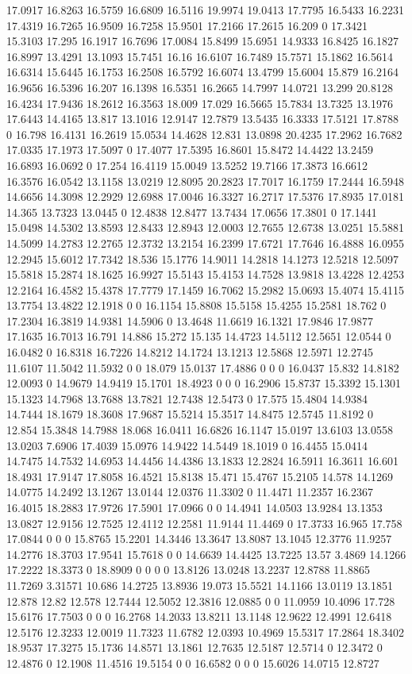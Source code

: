 17.0917 16.8263 16.5759 16.6809 16.5116 19.9974 19.0413 17.7795 16.5433 16.2231 17.4319 16.7265 16.9509 16.7258 15.9501 17.2166 17.2615 16.209 0 17.3421 15.3103 17.295 16.1917 16.7696 17.0084 15.8499 15.6951 14.9333 16.8425 16.1827 16.8997 13.4291 13.1093 15.7451 16.16 16.6107 16.7489 15.7571 15.1862 16.5614 16.6314 15.6445 16.1753 16.2508 16.5792 16.6074 13.4799 15.6004 15.879 16.2164 16.9656 16.5396 16.207 16.1398 16.5351 16.2665 14.7997 14.0721 13.299 20.8128 16.4234 17.9436 18.2612 16.3563 18.009 17.029 16.5665 15.7834 13.7325 13.1976 17.6443 14.4165 13.817 13.1016 12.9147 12.7879 13.5435 16.3333 17.5121 17.8788 0 16.798 16.4131 16.2619 15.0534 14.4628 12.831 13.0898 20.4235 17.2962 16.7682 17.0335 17.1973 17.5097 0 17.4077 17.5395 16.8601 15.8472 14.4422 13.2459 16.6893 16.0692 0 17.254 16.4119 15.0049 13.5252 19.7166 17.3873 16.6612 16.3576 16.0542 13.1158 13.0219 12.8095 20.2823 17.7017 16.1759 17.2444 16.5948 14.6656 14.3098 12.2929 12.6988 17.0046 16.3327 16.2717 17.5376 17.8935 17.0181 14.365 13.7323 13.0445 0 12.4838 12.8477 13.7434 17.0656 17.3801 0 17.1441 15.0498 14.5302 13.8593 12.8433 12.8943 12.0003 12.7655 12.6738 13.0251 15.5881 14.5099 14.2783 12.2765 12.3732 13.2154 16.2399 17.6721 17.7646 16.4888 16.0955 12.2945 15.6012 17.7342 18.536 15.1776 14.9011 14.2818 14.1273 12.5218 12.5097 15.5818 15.2874 18.1625 16.9927 15.5143 15.4153 14.7528 13.9818 13.4228 12.4253 12.2164 16.4582 15.4378 17.7779 17.1459 16.7062 15.2982 15.0693 15.4074 15.4115 13.7754 13.4822 12.1918 0 0 16.1154 15.8808 15.5158 15.4255 15.2581 18.762 0 17.2304 16.3819 14.9381 14.5906 0 13.4648 11.6619 16.1321 17.9846 17.9877 17.1635 16.7013 16.791 14.886 15.272 15.135 14.4723 14.5112 12.5651 12.0544 0 16.0482 0 16.8318 16.7226 14.8212 14.1724 13.1213 12.5868 12.5971 12.2745 11.6107 11.5042 11.5932 0 0 18.079 15.0137 17.4886 0 0 0 16.0437 15.832 14.8182 12.0093 0 14.9679 14.9419 15.1701 18.4923 0 0 0 16.2906 15.8737 15.3392 15.1301 15.1323 14.7968 13.7688 13.7821 12.7438 12.5473 0 17.575 15.4804 14.9384 14.7444 18.1679 18.3608 17.9687 15.5214 15.3517 14.8475 12.5745 11.8192 0 12.854 15.3848 14.7988 18.068 16.0411 16.6826 16.1147 15.0197 13.6103 13.0558 13.0203 7.6906 17.4039 15.0976 14.9422 14.5449 18.1019 0 16.4455 15.0414 14.7475 14.7532 14.6953 14.4456 14.4386 13.1833 12.2824 16.5911 16.3611 16.601 18.4931 17.9147 17.8058 16.4521 15.8138 15.471 15.4767 15.2105 14.578 14.1269 14.0775 14.2492 13.1267 13.0144 12.0376 11.3302 0 11.4471 11.2357 16.2367 16.4015 18.2883 17.9726 17.5901 17.0966 0 0 14.4941 14.0503 13.9284 13.1353 13.0827 12.9156 12.7525 12.4112 12.2581 11.9144 11.4469 0 17.3733 16.965 17.758 17.0844 0 0 0 15.8765 15.2201 14.3446 13.3647 13.8087 13.1045 12.3776 11.9257 14.2776 18.3703 17.9541 15.7618 0 0 14.6639 14.4425 13.7225 13.57 3.4869 14.1266 17.2222 18.3373 0 18.8909 0 0 0 0 13.8126 13.0248 13.2237 12.8788 11.8865 11.7269 3.31571 10.686 14.2725 13.8936 19.073 15.5521 14.1166 13.0119 13.1851 12.878 12.82 12.578 12.7444 12.5052 12.3816 12.0885 0 0 11.0959 10.4096 17.728 15.6176 17.7503 0 0 0 16.2768 14.2033 13.8211 13.1148 12.9622 12.4991 12.6418 12.5176 12.3233 12.0019 11.7323 11.6782 12.0393 10.4969 15.5317 17.2864 18.3402 18.9537 17.3275 15.1736 14.8571 13.1861 12.7635 12.5187 12.5714 0 12.3472 0 12.4876 0 12.1908 11.4516 19.5154 0 0 16.6582 0 0 0 15.6026 14.0715 12.8727 